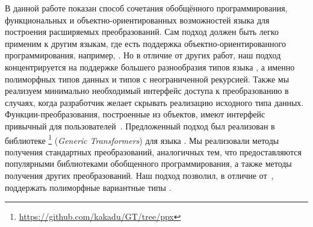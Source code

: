 \!\!\!В данной работе показан способ сочетания обобщённого программирования, функциональных и объектно-ориентированных возможностей  языка \OCaml{} для построения расширяемых преобразований. Сам подход должен быть легко применим  к другим языкам, где есть поддержка объектно-ориентированного программирования, например, \Scala{}.  
Но в отличие от других работ, наш подход концентрируется на поддержке большего разнообразия типов языка \OCaml{}, а именно полиморфных типов данных и типов с неограниченной рекурсией.
Также мы реализуем  минимально необходимый интерфейс доступа к преобразованию в  случаях, когда разработчик желает скрывать реализацию исходного типа данных.
Функции-преобразования, построенные из объектов, имеют интерфейс привычный для пользователей~\cite{ppxderiving}.
Предложенный подход был реализован в  библиотеке \GT{}\footnote{\url{https://github.com/kakadu/GT/tree/ppx}} (\emph{Generic Transformers}) для языка \ocaml{}. Мы  реализовали методы получения стандартных преобразований, аналогичных тем, что предоставляются популярными библиотеками обобщенного программирования, а также методы получения других преобразований.
Наш подход позволил, в отличие от~\cite{Visitors},  поддержать полиморфные вариантные типы  \ocaml{}. 



